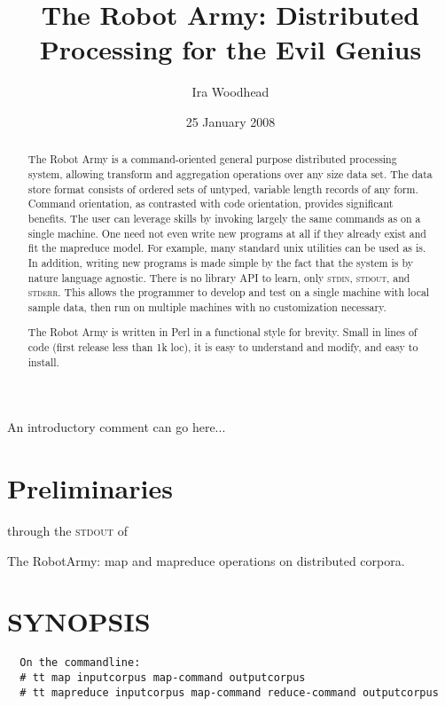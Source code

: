 \documentclass{tufte-handout}
\title{The Robot Army: Distributed Processing for the Evil Genius}
\author{Ira Woodhead}
\date{25 January 2008}  %
\begin{document}
\maketitle %

\begin{abstract}
\noindent 

The Robot Army is a command-oriented general purpose distributed processing system, allowing transform and aggregation operations over any size data set. The data store format consists of ordered sets of untyped, variable length records of any form. Command orientation, as contrasted with code orientation, provides significant benefits. The user can leverage skills by invoking largely the same commands as on a single machine. One need not even write new programs at all if they already exist and fit the mapreduce model. For example, many standard unix utilities can be used as is. In addition, writing new programs is made simple by the fact that the system is by nature language agnostic. There is no library API to learn, only \textsc{stdin}, \textsc{stdout}, and \textsc{stderr}. This allows the programmer to develop and test on a single machine with local sample data, then run on multiple machines with no customization necessary.

The Robot Army is written in Perl in a functional style for brevity. Small in lines of code (first release less than 1k loc), it is easy to understand and modify, and easy to install.

\end{abstract}


An introductory comment can go here...


\section{Preliminaries}\label{sec:preliminaries}


 through the \textsc{stdout} of 


The RobotArmy: map and mapreduce operations on distributed corpora.

\section{SYNOPSIS\label{SYNOPSIS}}
\begin{verbatim}
  On the commandline:
  # tt map inputcorpus map-command outputcorpus
  # tt mapreduce inputcorpus map-command reduce-command outputcorpus
\end{verbatim}
\end{document}
